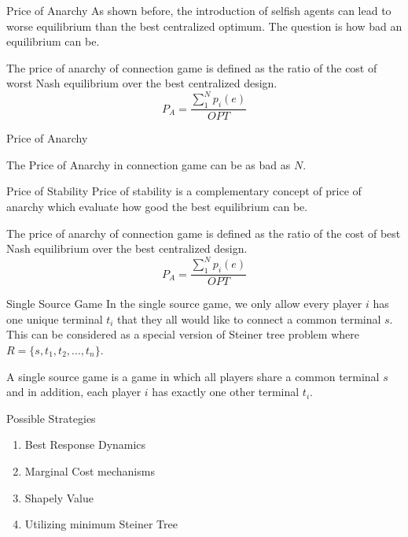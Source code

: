 \documentclass[11pt,aspectratio=169]{beamer}
\begin{document}
\begin{frame}{Price of Anarchy}
    As shown before, the introduction of selfish agents can lead to worse equilibrium than the best centralized optimum. The question is how bad an equilibrium can be.

    \begin{definition} The price of anarchy of connection game is defined as the ratio of the cost of worst Nash equilibrium over the best centralized design.
        \[P_A = \dfrac{\sum_{1}^{N}p_i(e) }{OPT}\]
    \end{definition}
   
\end{frame}

\begin{frame}{Price of Anarchy}
    \begin{lemma}
        The Price of Anarchy in connection game can be as bad as \(N\).
    \end{lemma}
\end{frame}

\begin{frame}{Price of Stability}
    Price of stability is a complementary concept of price of anarchy which evaluate how good the best equilibrium can be. 

\begin{definition} 
    The price of anarchy of connection game is defined as the ratio of the cost of best Nash equilibrium over the best centralized design.
    \[P_A = \dfrac{\sum_{1}^{N}p_i(e) }{OPT}\]
    \end{definition}
\end{frame}

\begin{frame}{Single Source Game}
    In the single source game, we only allow every player \(i\) has one unique terminal \(t_i\) that they all would like to connect a common terminal \(s\). This can be considered as a special version of Steiner tree problem where \(R = \{s,t_1,t_2,...,t_n\}\). 
\vspace{10pt}
\begin{definition}
	A single source game is a game in which all players share a common terminal \(s\) and in addition, each player \(i\) has exactly one other terminal \(t_i\).
\end{definition}
\end{frame}

\begin{frame}{Possible Strategies}
    \begin{enumerate}
        \item Best Response Dynamics 
        \item Marginal Cost mechanisms
        \item Shapely Value 
        \item Utilizing minimum Steiner Tree
    \end{enumerate}
\end{frame}
\end{document}
